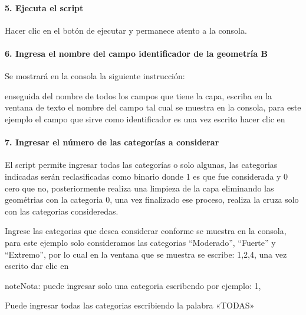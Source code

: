 \documentclass[letterpaper,10pt,spanish]{sphinxmanual}
\begin{document}
\paragraph{5. Ejecuta el script}
\label{\detokenize{tabulacion_3geo:ejecuta-el-script}}
Hacer clic en el botón de ejecutar y permanece atento a la consola.


\paragraph{6. Ingresa el nombre del campo identificador de la geometría B}
\label{\detokenize{tabulacion_3geo:ingresa-el-nombre-del-campo-identificador-de-la-geometria-b}}
Se mostrará en la consola la siguiente instrucción:


enseguida del nombre de todos los campos que tiene la capa, escriba en la
ventana de texto el nombre del campo tal cual se muestra en la consola,
para este ejemplo el campo que sirve como identificador es   una vez escrito
hacer clic en 

\noindent{}


\paragraph{7. Ingresar el número de las categorías a considerar}
\label{\detokenize{tabulacion_3geo:ingresar-el-numero-de-las-categorias-a-considerar}}
El script permite ingresar todas las categorías o solo algunas, las categorias
indicadas serán reclasificadas como binario donde 1 es que fue considerada y 0 cero que no,
posteriormente realiza una limpieza de la capa eliminando las geométrias con la categoria 0,
una vez finalizado ese proceso, realiza la cruza solo con las categorias consideredas.

Ingrese las categorias que desea considerar conforme se muestra en la consola, para
este ejemplo solo consideramos las categorias “Moderado”, “Fuerte” y “Extremo”, por lo
cual en la ventana que se muestra se escribe: 1,2,4, una vez escrito dar clic en 

\begin{sphinxadmonition}{note}{Nota:}
puede ingresar solo una categoria escribendo por ejemplo: 1,

Puede ingresar todas las categorias escribiendo la palabra «TODAS»
\end{sphinxadmonition}
\end{document}
